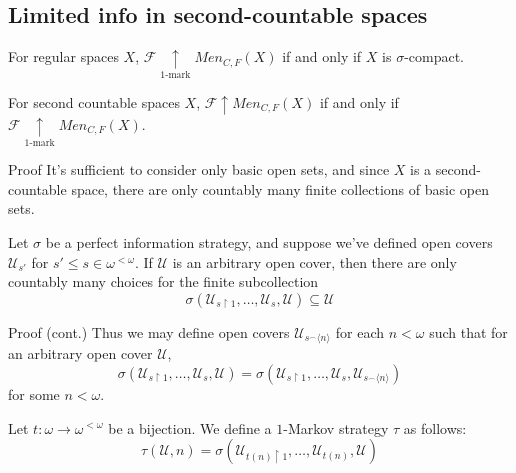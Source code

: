 \documentclass{beamer}
\theoremstyle{definition}
\newcommand{\win}{\uparrow}
\newcommand{\kmarkwin}[1]{\underset{#1\text{-mark}}{\uparrow}}
\newcommand{\mengame}[1]{Men_{C,F}(#1)}
\newcommand{\concat}{{^\frown}}
\newcommand{\rest}{\restriction}
\newcommand{\<}{\langle}
\renewcommand{\>}{\rangle}
\newcommand{\mc}[1]{\mathcal{#1}}
\newcommand{\pl}[1]{\mathscr{#1}}
\begin{document}
\subsection{Limited info in second-countable spaces}

\begin{frame}
  \begin{corollary}
    For regular spaces $X$,
    $\pl F \kmarkwin{1}\mengame X$ if and only if $X$ is
    $\sigma$-compact.
  \end{corollary}

  \vpause

  \begin{theorem}
    For second countable spaces $X$, $\pl F \win \mengame X$ if and only if
    $\pl F \kmarkwin{1}\mengame X$.
  \end{theorem}
\end{frame}

\begin{frame}{Proof}
  It's sufficient to consider only basic open sets, and
  since $X$ is a second-countable space, there are only
  countably many finite collections of basic open sets.

  \vpause

  Let $\sigma$ be a perfect information strategy, and suppose we've defined
  open covers $\mc U_{s'}$ for $s'\leq s\in\omega^{<\omega}$. If $\mc U$ is an
  arbitrary open cover, then there are only countably many
  choices for the finite subcollection
  \[
    \sigma(\mc U_{s\rest 1},\dots,\mc U_{s},\mc U) \subseteq \mc U
  \]
\end{frame}

\begin{frame}{Proof (cont.)}
  Thus we may define open covers $\mc U_{s\concat\<n\>}$ for each
  $n<\omega$ such that for an arbitrary open cover $\mc U$,
  \[
    \sigma(\mc U_{s\rest 1},\dots,\mc U_{s},\mc U)
      =
    \sigma(\mc U_{s\rest 1},\dots,\mc U_{s},\mc U_{s\concat\<n\>})
  \]
  for some $n<\omega$.

  \vpause

  Let $t:\omega\to\omega^{<\omega}$ be a bijection. We define a $1$-Markov
  strategy $\tau$ as follows:
  \[
    \tau(\mc U,n) = \sigma(\mc U_{t(n)\rest 1},\dots,\mc U_{t(n)},\mc U)
  \]
\end{frame}
\end{document}
